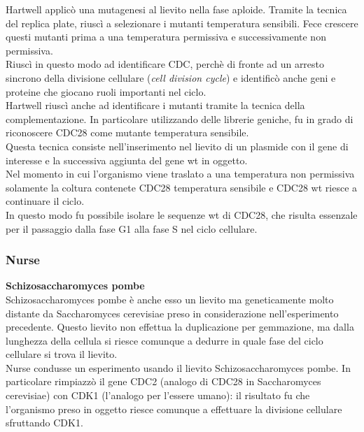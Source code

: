                 
            Hartwell applicò una mutagenesi al lievito nella fase aploide. Tramite la tecnica del replica plate, riuscì a selezionare i mutanti temperatura sensibili. 
            Fece crescere questi mutanti prima a una temperatura permissiva e successivamente non permissiva.\\
            Riuscì in questo modo ad identificare CDC, perchè di fronte ad un arresto sincrono della divisione cellulare (\textit{cell division cycle}) e identificò anche geni e proteine che giocano ruoli importanti nel ciclo.\\
            Hartwell riuscì anche ad identificare i mutanti tramite la tecnica della complementazione. In particolare utilizzando delle librerie geniche, fu in grado di riconoscere CDC28 come mutante temperatura sensibile.\\
            Questa tecnica consiste nell'inserimento nel lievito di un plasmide con il gene di interesse e la successiva aggiunta del gene wt in oggetto.\\
            Nel momento in cui l'organismo viene traslato a una temperatura non permissiva solamente la coltura contenete CDC28 temperatura sensibile e CDC28 wt riesce a continuare il ciclo.\\
            In questo modo fu possibile isolare le sequenze wt di CDC28, che risulta essenzale per il passaggio dalla fase G1 alla fase S nel ciclo cellulare.
        
        \subsubsection{Nurse}
            \textbf{Schizosaccharomyces pombe}\\
                Schizosaccharomyces pombe è anche esso un lievito ma geneticamente molto distante da Saccharomyces cerevisiae preso in considerazione nell'esperimento precedente. 
                Questo lievito non effettua la duplicazione per gemmazione, ma dalla lunghezza della cellula si riesce comunque a dedurre in quale fase del ciclo cellulare si trova il lievito.\\
                
                
            Nurse condusse un esperimento usando il lievito Schizosaccharomyces pombe. In particolare rimpiazzò il gene CDC2 (analogo di CDC28 in Saccharomyces cerevisiae) con CDK1 (l'analogo per l'essere umano): il risultato fu che l'organismo preso in oggetto riesce comunque a effettuare la divisione cellulare sfruttando CDK1.
    
